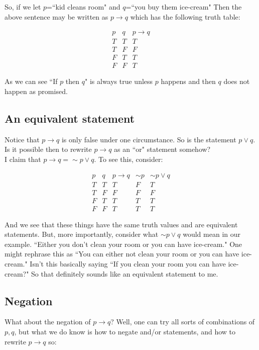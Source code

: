 So, if we let $p$=``kid cleans room" and $q$=``you buy them ice-cream"  Then the above sentence may be written as $p\to q$ which has the following truth table:

$$
\begin{array}{c|c|c}
p&q&p\to q\\
\hline
T&T&T\\
T&F&F\\
F&T&T\\
F&F&T
\end{array}
$$


As we can see ``If $p$ then $q$" is always true unless $p$ happens and then $q$ does not happen as promised.

\subsection{An equivalent statement}

Notice that $p\to q$ is only false under one circumstance.  So is the statement $p\vee q$.  Is it possible then to rewrite $p\to q$ as an ``or" statement somehow?\\

I claim that $p \to q = \sim p \vee q$.  To see this, consider:


 
$$
\begin{array}{c|c|c|c|c}
p&q&p\to q&\sim p & \sim p \vee q\\
\hline
T&T&T&F&T\\
T&F&F&F&F\\
F&T&T&T&T\\
F&F&T&T&T
\end{array}
$$

And we see that these things have the same truth values and are equivalent statements.  But, more importantly, consider what $\sim p \vee q$ would mean in our example.  ``Either you don't clean your room or you can have ice-cream."  One might rephrase this as ``You can either not clean your room or you can have ice-cream."  Isn't this basically saying ``If you clean your room you can have ice-cream?"  So that definitely sounds like an equivalent statement to me.

\subsection{Negation}

What about the negation of $p\to q$?  Well, one can try all sorts of combinations of $p, q$, but what we do know is how to negate and/or statements, and how to rewrite $p\to q$ so:

